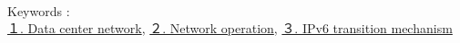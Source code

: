 





~\\ 

Keywords : \\
\underline{１. Data center network},
\underline{２. Network operation},
\underline{３. IPv6 transition mechanism}
\begin{flushright}
\edept \\
\eauthor
\end{flushright}
